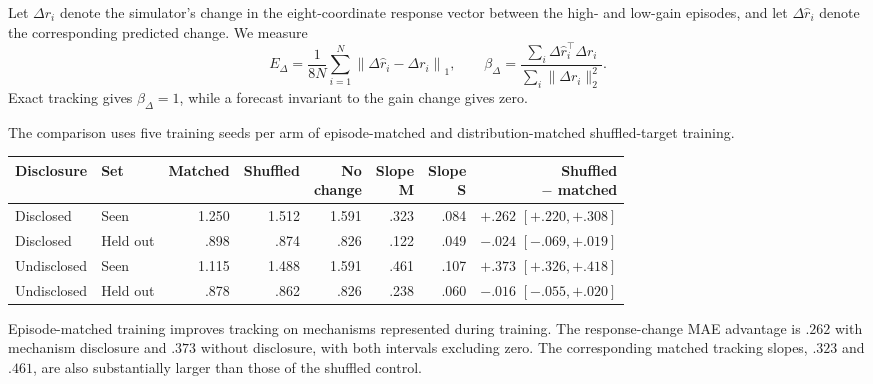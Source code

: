 Let \(\Delta r_i\) denote the simulator's change in the eight-coordinate response vector between the high- and low-gain episodes, and let \(\Delta\widehat r_i\) denote the corresponding predicted change.
We measure
\[
E_{\Delta}
=
\frac{1}{8N}
\sum_{i=1}^{N}
\left\|
\Delta\widehat r_i-\Delta r_i
\right\|_1,
\qquad
\beta_{\Delta}
=
\frac{\sum_i\Delta\widehat r_i^\top\Delta r_i}
{\sum_i\lVert\Delta r_i\rVert_2^2}.
\]
Exact tracking gives \(\beta_{\Delta}=1\), while a forecast invariant to the gain change gives zero.

The comparison uses five training seeds per arm of episode-matched and distribution-matched shuffled-target training.

\begin{center}
\begin{minipage}{\linewidth}
\centering
{}
\label{tab:exp3-gain-evidence}
\footnotesize
\setlength{\tabcolsep}{3pt}
\begin{tabular}{llrrrrrr}
\toprule
Disclosure & Set & Matched & Shuffled & \shortstack{No\\change} & \shortstack{Slope\\M} & \shortstack{Slope\\S} & \shortstack{Shuffled\\\(-\) matched} \\
\midrule
Disclosed & Seen     & 1.250 & 1.512 & 1.591 & .323 & .084 & \(+.262\) \([+.220,+.308]\) \\
Disclosed & Held out & .898  & .874  & .826  & .122 & .049 & \(-.024\) \([-.069,+.019]\) \\
Undisclosed & Seen     & 1.115 & 1.488 & 1.591 & .461 & .107 & \(+.373\) \([+.326,+.418]\) \\
Undisclosed & Held out & .878  & .862  & .826  & .238 & .060 & \(-.016\) \([-.055,+.020]\) \\
\bottomrule
\end{tabular}
\end{minipage}
\end{center}

Episode-matched training improves tracking on mechanisms represented during training.
The response-change MAE advantage is $.262$ with mechanism disclosure and $.373$ without disclosure, with both intervals excluding zero.
The corresponding matched tracking slopes, $.323$ and $.461$, are also substantially larger than those of the shuffled control.


